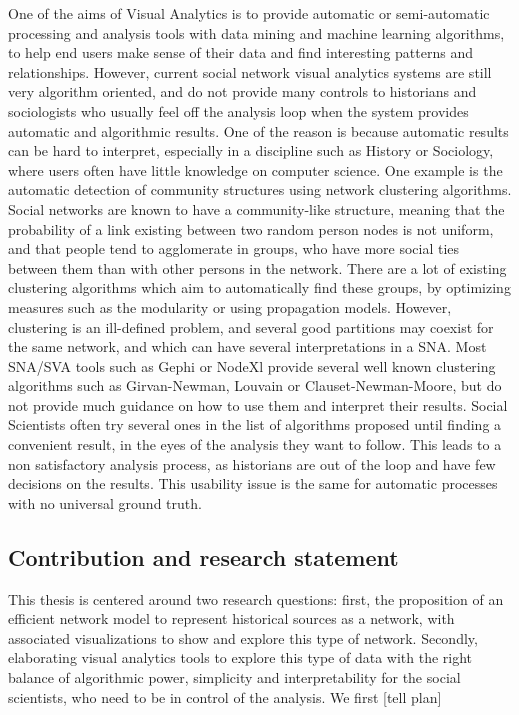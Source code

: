 One of the aims of Visual Analytics is to provide automatic or semi-automatic processing and analysis tools with data mining and machine learning algorithms, to help end users make sense of their data and find interesting patterns and relationships.
However, current social network visual analytics systems are still very algorithm oriented, and do not provide many controls to historians and sociologists who usually feel off the analysis loop when the system provides automatic and algorithmic results. One of the reason is because automatic results can be hard to interpret, especially in a discipline such as History or Sociology, where users often have little knowledge on computer science.
One example is the automatic detection of community structures using network clustering algorithms. Social networks are known to have a community-like structure, meaning that the probability of a link existing between two random person nodes is not uniform, and that people tend to agglomerate in groups, who have more social ties between them than with other persons in the network.
There are a lot of existing clustering algorithms which aim to automatically find these groups, by optimizing measures such as the modularity or using propagation models.
However, clustering is an ill-defined problem, and several good partitions may coexist for the same network, and which can have several interpretations in a SNA. Most SNA/SVA tools such as Gephi or NodeXl provide several well known clustering algorithms such as Girvan-Newman, Louvain or Clauset-Newman-Moore, but do not provide much guidance on how to use them and interpret their results.
Social Scientists often try several ones in the list of algorithms proposed until finding a convenient result, in the eyes of the analysis they want to follow.
This leads to a non satisfactory analysis process, as historians are out of the loop and have few decisions on the results. This usability issue is the same for automatic processes with no universal ground truth.

\subsection{Contribution and research statement}

This thesis is centered around two research questions: first, the proposition of an efficient network model to represent historical sources as a network, with associated visualizations to show and explore this type of network. Secondly, elaborating visual analytics tools to explore this type of data with the right balance of algorithmic power, simplicity and interpretability for the social scientists, who need to be in control of the analysis. We first [tell plan]
